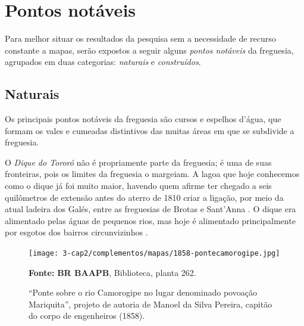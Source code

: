 \section{Pontos notáveis}\label{sec:pontnot}

Para melhor situar os resultados da pesquisa sem a necessidade de recurso constante a mapas, serão expostos a seguir alguns \textit{pontos notáveis} da freguesia, agrupados em duas categorias: \textit{naturais} e \textit{construídos}.

\subsection{Naturais}\label{subsec:pontnat}

Os principais pontos notáveis da freguesia são cursos e espelhos d'água, que formam os vales e cumeadas distintivos das muitas áreas em que se subdivide a freguesia.

O \textit{Dique do Tororó} não é propriamente parte da freguesia; é uma de suas fronteiras, pois os limites da freguesia o margeiam. A lagoa que hoje conhecemos como o dique já foi muito maior, havendo quem afirme ter chegado a seis quilômetros de extensão antes do aterro de 1810 criar a ligação, por meio da atual ladeira dos Galés, entre as freguesias de Brotas e Sant'Anna \cite[p.~48]{santos_aguas_2010}. O dique era alimentado pelas águas de pequenos rios, mas hoje é alimentado principalmente por esgotos dos bairros circunvizinhos \cite[p.~41]{santos_aguas_2010}.

\begin{figure}
\caption{``Ponte sobre o rio Camorogipe no lugar denominado povoação Mariquita'', projeto de autoria de Manoel da Silva Pereira, capitão do corpo de engenheiros (1858).}
\centering
\texttt{[image: 3-cap2/complementos/mapas/1858-pontecamorogipe.jpg]}{\footnotesize \par \textbf{Fonte:} \textbf{BR BAAPB}, Biblioteca, planta 262. \par}
\label{fig:pontecamorogipe}
\end{figure}

